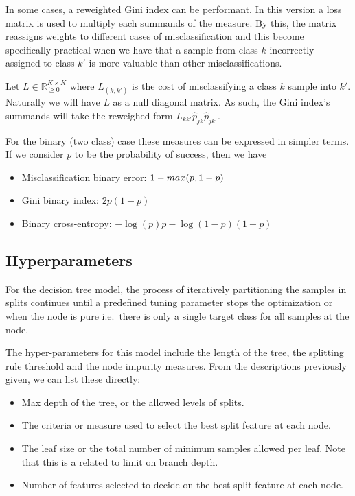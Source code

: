 In some cases, a reweighted Gini index can be performant.
In this version a loss matrix is used to multiply each summands of the measure.
By this, the matrix reassigns weights to different cases of misclassification and this become specifically practical when we have that a sample from class $k$ incorrectly assigned to class $k'$ is more valuable than other misclassifications.

Let $L \in \mathbb R_{\ge 0}^{K \times K}$ where $L_{(k,k')}$ is the cost of misclassifying a class $k$ sample into $k'$.
Naturally we will have $L$ as a null diagonal matrix.
As such, the Gini index's summands will take the reweighed form $L_{kk'} \hat{p}_{jk} \hat{p}_{jk'}$.

For the binary (two class) case these measures can be expressed in simpler terms. 
If we consider $p$ to be the probability of success, then we have

\begin{itemize}
\item Misclassification binary error: $1 - \\max(p, 1-p)$
\item Gini binary index: $ 2p(1-p) $
\item Binary cross-entropy: $ -\log(p)p - \log(1- p)(1-p) $
\end{itemize}\label{decisionTreeCostFunctions}

\subsection{Hyperparameters}\label{subsection:decision_trees_hyperparameters}


For the decision tree model, the process of iteratively partitioning the samples in splits continues until a predefined tuning parameter stops the optimization or when the node is pure i.e.\ there is only a single target class for all samples at the node.

The hyper-parameters for this model include the length of the tree, the splitting rule threshold and the node impurity measures. 
From the descriptions previously given, we can list these directly:

\begin{itemize}
\item Max depth of the tree, or the allowed levels of splits.
\item The criteria or measure used to select the best split feature at each node.
\item The leaf size or the total number of minimum samples allowed per leaf. 
Note that this is a related to limit on branch depth.
\item Number of features selected to decide on the best split feature at each node.
\end{itemize}


